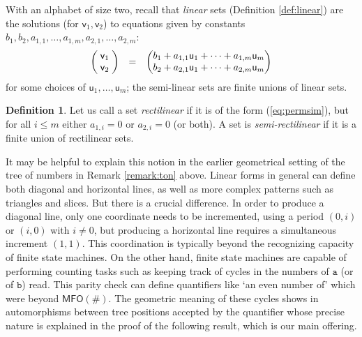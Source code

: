 \documentclass[12pt,oneside,reqno]{amsart}
\theoremstyle{definition}
\newtheorem{definition}{Definition}
\begin{document}

With an alphabet of size two, recall that \emph{linear} sets (Definition \ref{def:linear}) are the solutions (for $\mathsf{v}_1,\mathsf{v}_2$) to equations given by constants $b_1,b_2,a_{1,1},\dots,a_{1,m},a_{2,1},\dots,a_{2,m}$: 
\begin{equation}
 \begin{pmatrix}
\;\mathsf{v}_1\;  \\
\mathsf{v}_2
\end{pmatrix} \hspace{.1in} = \hspace{.1in}
 \begin{pmatrix}
b_1   +  a_{1,1}\mathsf{u}_1+ \dots + a_{1,m}\mathsf{u}_m   \\
b_2   +  a_{2,1}\mathsf{u}_1+ \dots + a_{2,m}\mathsf{u}_m
\end{pmatrix} \label{eq:permsim}
\end{equation} for some choices of $\mathsf{u}_1,\dots,\mathsf{u}_m$; the semi-linear sets are finite unions of linear sets. 
\begin{definition} Let us call a set \emph{rectilinear} if it is of the form (\ref{eq:permsim}), but for all $i \leq m$ either $a_{1,i} = 0$ or $a_{2,i}=0$  (or both). A set is \emph{semi-rectilinear} if it is a finite union of rectilinear sets.
\end{definition}

It may be helpful to explain this notion in the earlier geometrical setting of the tree of numbers in Remark \ref{remark:ton} above. Linear forms in general can define both diagonal and horizontal lines, as well as more complex patterns such as triangles and slices. But there is a crucial difference. In order to produce a diagonal line, only one coordinate needs to be incremented, using a period $(0, i)$ or $(i, 0)$ with $i \neq 0$, but producing a horizontal line requires a simultaneous increment $(1, 1)$. This coordination is typically beyond the recognizing capacity of finite state machines. On the other hand, finite state machines are capable of performing counting tasks such as keeping track of cycles in the numbers of $\mathtt{a}$ (or of $\mathtt{b}$) read. This parity check can define quantifiers like `an even number of' which were beyond $\mathsf{MFO}(\#)$. The geometric meaning of these cycles shows in automorphisms between tree positions accepted by the quantifier whose precise nature is explained in the proof of the following result, which is our main offering.
\end{document}
